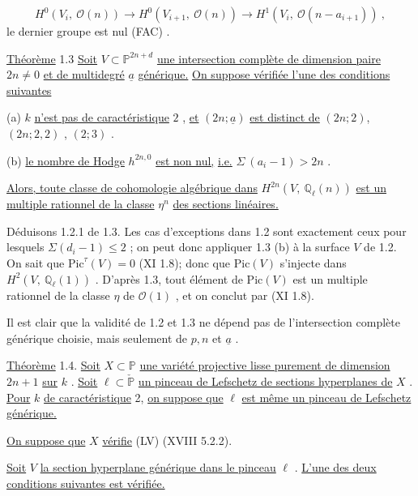 \begin{equation*}
H^0(V_i,\ \mathcal{O}(n)) \longrightarrow H^0(V_{i+1},\ \mathcal{O}(n)) \longrightarrow H^1(V_i,\ \mathcal{O}(n - a_{i+1}))\ ,
\end{equation*}
le dernier groupe est nul (FAC) .

\underline{Théorème} 1.3 \qquad \underline{Soit} $V \subset \mathbb{P}^{2n+d}$ \underline{une intersection complète de dimension paire} $2n \neq 0$ \underline{et de multidegré} $\underline{a}$ \underline{générique.} \underline{On suppose vérifiée l'une des conditions suivantes}

(a) \quad $k$ \underline{n'est pas de caractéristique} $2$ , \underline{et} $(2n; \underline{a})$ \underline{est distinct de} $(2n; 2)$, $(2n; 2, 2)$ , $(2; 3)$ .

(b) \quad \underline{le nombre de Hodge} $h^{2n,0}$ \underline{est non nul,} \underline{i.e.} $\Sigma\ (a_i-1) > 2n$ .

\underline{Alors, toute classe de cohomologie algébrique dans} $H^{2n}(V,\ \mathbb{Q}_\ell(n))$ \underline{est un multiple rationnel de la classe} $\eta^n$ \underline{des sections linéaires.}

Déduisons 1.2.1 de 1.3. Les cas d'exceptions dans 1.2 sont exactement ceux pour lesquels $\Sigma(d_i -1) \leq 2$ ; on peut donc appliquer 1.3 (b) à la surface $V$ de 1.2. On sait que $\mathrm{Pic}^{\tau}(V) = 0$ (XI 1.8); donc que $\mathrm{Pic}(V)$ s'injecte dans $H^2(V,\ \mathbb{Q}_\ell(1))$ . D'après 1.3, tout élément de $\mathrm{Pic}(V)$ est un multiple rationnel de la classe $\eta$ de $\mathcal{O}(1)$ , et on conclut par (XI 1.8).

Il est clair que la validité de 1.2 et 1.3 ne dépend pas de l'intersection complète générique choisie, mais seulement de $p, n$ et $\underline{a}$ .



\underline{Théorème} 1.4. \quad \underline{Soit} $X \subset \mathbb{P}$ \underline{une variété projective lisse purement de dimension} $2n + 1$ \underline{sur} $k$ . \underline{Soit} $\ell \subset \check{\mathbb{P}}$ \underline{un pinceau de Lefschetz de sections hyperplanes de} $X$ . \underline{Pour} $k$ \underline{de caractéristique} 2, \underline{on suppose que} $\ell$ \underline{est même un pinceau de Lefschetz générique.}

\underline{On suppose que} $X$ \underline{vérifie} (LV)  (XVIII 5.2.2).

\underline{Soit} $V$ \underline{la section hyperplane générique dans le pinceau} $\ell$ . \underline{L'une des deux conditions suivantes est vérifiée.}

